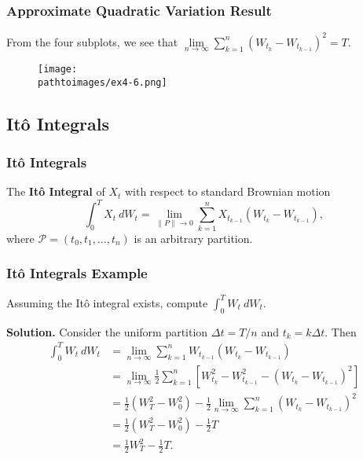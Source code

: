 \documentclass{beamer}
\newcommand{\pathtoimages}{/Users/charlesrambo/Desktop/Bootcamp24/Images}
\begin{document}
\begin{frame}[fragile]
\frametitle{Approximate Quadratic Variation Result}
From the four subplots, we see that $\lim\limits_{n\to\infty} \sum_{k = 1}^n \left(W_{t_k} - W_{t_{k - 1}}\right)^2 = T$.
\begin{figure}
\centering
\texttt{[image: \\pathtoimages/ex4-6.png]}
\end{figure}
\end{frame}



\subsection{It\^o Integrals}

\begin{frame}
\frametitle{It\^o Integrals}
\begin{Definition}
The {\bf It\^o Integral} of $X_t$ with respect to standard Brownian motion
$$
\int_0^T X_t\ dW_t = \lim_{\| P\|\to 0} \sum_{k = 1}^{n } X_{t_{k - 1}} (W_{t_k} - W_{t_{k - 1}}),
$$
where $\mathcal{P} = (t_0, t_1,\ldots, t_n)$ is an arbitrary partition.
\end{Definition}

\end{frame}

\begin{frame}
\frametitle{It\^o Integrals Example}
\small 
\begin{Example}
Assuming the It\^o integral exists, compute $\int_0^T W_t\ dW_t$.
\end{Example}

{\bf Solution.}
Consider the uniform partition $\Delta t = T/n$ and $t_k = k \Delta t$. Then
\begin{align*}
\int_0^ T W_t\ dW_t 	&= \lim_{n\to\infty}\sum_{k = 1}^n W_{t_{k - 1}} \left(W_{t_k} - W_{t_{k - 1}}\right)\\
				&= \lim_{n\to\infty}\frac{1}{2} \sum_{k = 1}^n \left[ W_{t_k}^2 - W_{t_{k - 1}}^2 - (W_{t_k} - W_{t_{k - 1}})^2\right]\\
				&=  \frac{1}{2} (W_{T}^2 - W_0^2) - \frac{1}{2}\lim_{n\to\infty} \sum_{k = 1}^n (W_{t_k} - W_{t_{k - 1}})^2\\
				&= \frac{1}{2} (W_{T}^2 - W_0^2) - \frac{1}{2}T\\
				&= \frac{1}{2} W_{T}^2 - \frac{1}{2}T.
\end{align*}

\end{frame}
\end{document}
